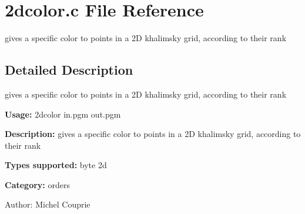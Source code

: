 \section{2dcolor.c File Reference}
\label{2dcolor_8c}
gives a specific color to points in a 2D khalimsky grid, according to their rank 



\subsection{Detailed Description}
gives a specific color to points in a 2D khalimsky grid, according to their rank 

{\bf Usage:} 2dcolor in.pgm out.pgm

{\bf Description:} gives a specific color to points in a 2D khalimsky grid, according to their rank

{\bf Types supported:} byte 2d

{\bf Category:} orders

\begin{Desc}
\item[Author:]Michel Couprie \end{Desc}
